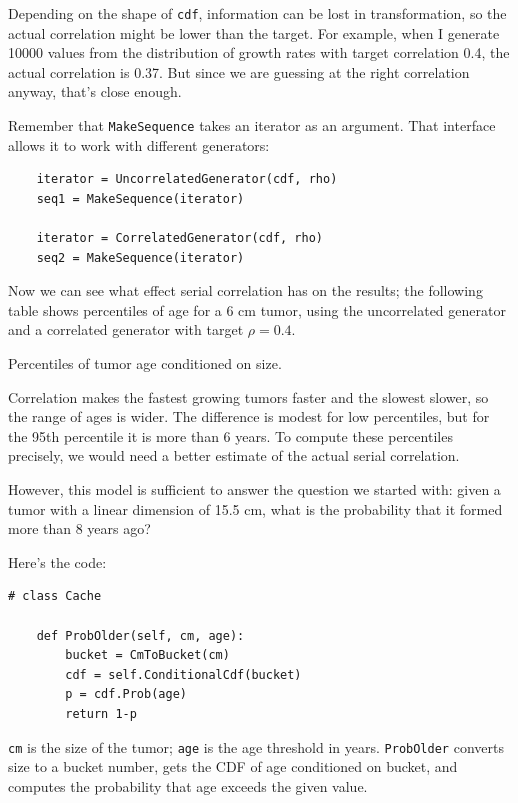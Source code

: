 \documentclass[12pt]{book}
\begin{document}
Depending on the shape of {\tt cdf}, information can
be lost in transformation, so the actual correlation might be
lower than the target.  For example, when I generate
10000 values from the distribution of growth rates with
target correlation 0.4, the actual correlation is 0.37.
But since we are guessing at the right correlation anyway,
that's close enough.

Remember that {\tt MakeSequence} takes an iterator as an argument.
That interface allows it to work with different generators:

\begin{verbatim}
    iterator = UncorrelatedGenerator(cdf, rho)
    seq1 = MakeSequence(iterator)

    iterator = CorrelatedGenerator(cdf, rho)
    seq2 = MakeSequence(iterator)
\end{verbatim}

Now we can see what effect serial correlation has on the results;
the following table shows percentiles of age for a 6 cm tumor,
using the uncorrelated generator and a correlated generator
with target $\rho = 0.4$.

\begin{table}

\caption{Percentiles of tumor age conditioned on size.}
\end{table}

Correlation makes the fastest growing tumors faster and the slowest
slower, so the range of ages is wider.  The difference is modest for
low percentiles, but for the 95th percentile it is more than 6 years.
To compute these percentiles precisely, we would need a better
estimate of the actual serial correlation.

However, this model is sufficient to answer the question
we started with: given a tumor with a linear dimension of
15.5 cm, what is the probability that it formed more than
8 years ago?

Here's the code:

\begin{verbatim}
# class Cache

    def ProbOlder(self, cm, age):
        bucket = CmToBucket(cm)
        cdf = self.ConditionalCdf(bucket)
        p = cdf.Prob(age)
        return 1-p
\end{verbatim}

{\tt cm} is the size of the tumor; {\tt age} is the age threshold
in years.  {\tt ProbOlder} converts size to a bucket number,
gets the CDF of age conditioned on bucket, and computes the
probability that age exceeds the given value.
\end{document}
